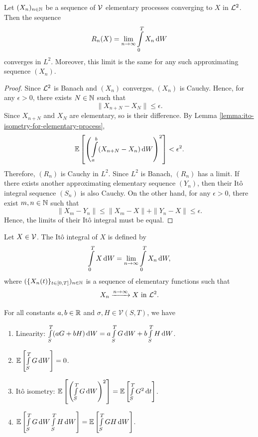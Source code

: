 \begin{theorem}
  Let $(X_n)_{n\in\mathbb{N}}$ be a sequence of $\mathcal{V}$ elementary processes converging to $X$ in $\mathcal{L}^2$. Then the sequence
  $$R_n(X) = \lim\limits_{n\to\infty}\int\limits_0^T X_n\,\mathrm{d} W$$
  converges in $L^2$. Moreover, this limit is the same for any such approximating sequence $(X_n)$.
\end{theorem}

\begin{proof}
  Since $\mathcal{L}^2$ is Banach and $(X_n)$ converges, $(X_n)$ is Cauchy. Hence, for any $\epsilon>0$, there exists $N\in\mathbb{N}$ such that
  $$\|X_{n+N} - X_{N}\|\le\epsilon.$$
  Since $X_{n+N}$ and $X_{N}$ are elementary, so is their difference. By Lemma \ref{lemma:ito-isometry-for-elementary-process},
  $$\mathbb{E}\left[\left(\int\limits_a^b (X_{n+N}-X_n)\,\mathrm{d} W \right)^2\right] < \epsilon^2.$$
  Therefore, $(R_n)$ is Cauchy in $L^2$. Since $L^2$ is Banach, $(R_n)$ has a limit. If there exists another approximating elementary sequence $(Y_n)$, then their Itô integral sequence $(S_n)$ is also Cauchy. On the other hand, for any $\epsilon >0$, there exist $m,n\in\mathbb{N}$ such that
  $$\|X_m-Y_n\| \le \|X_m-X\| + \|Y_n - X\|\le \epsilon.$$
  Hence, the limits of their Itô integral must be equal.
\end{proof}

\begin{definition}
  Let $X\in \mathcal{V}$. The Itô integral of $X$ is defined by
  \begin{equation}
    \int\limits_0^T X\,\mathrm{d} W =  \lim\limits_{n\to\infty}\int\limits_0^T X_n\,\mathrm{d} W,
  \end{equation}
  where $(\{X_n(t)\}_{t\in[0,T]})_{n\in\mathbb{N}}$ is a sequence of elementary functions such that
  $$X_n \xrightarrow{n\to\infty} X \text{ in } \mathcal{L}^2.$$
\end{definition}

\begin{theorem}
  \label{theorem:prop}
  For all constants $a,b\in\mathbb{R}$ and $\sigma,H\in\mathcal{V}(S,T)$, we have
  \begin{enumerate}
    \item Linearity: $\int\limits_{S}^T(aG+bH)\,\mathrm{d} W = a\int\limits_{S}^TG\,\mathrm{d} W+b\int\limits_{S}^TH\,\mathrm{d} W$.
    \item $\mathbb{E}\left[\int\limits_{S}^TG\,\mathrm{d} W\right]=0$.
    \item Itô isometry: $\mathbb{E}\left[\left(\int\limits_{S}^TG\,\mathrm{d} W\right)^2\right]=\mathbb{E}\left[\int\limits_{S}^TG^2\,\mathrm{d} t\right]$.
    \item $\mathbb{E}\left[\int\limits_{S}^TG\,\mathrm{d} W\int\limits_{S}^TH\,\mathrm{d} W\right]=\mathbb{E}\left[\int\limits_{S}^TGH\,\mathrm{d} W\right]$.
  \end{enumerate}
\end{theorem}


